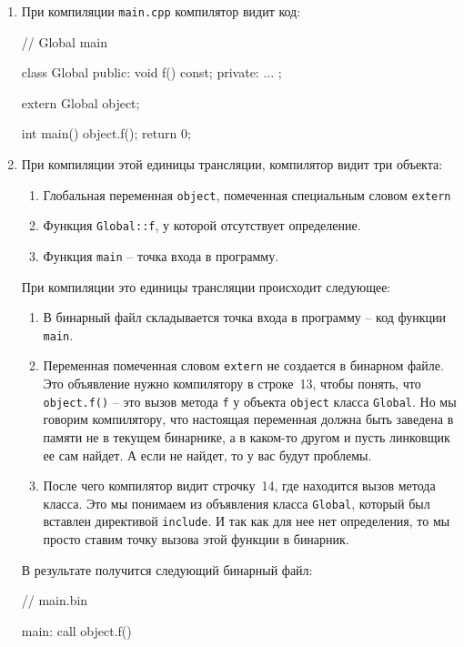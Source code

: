 {\begin{enumerate}
\item При компиляции \verb"main.cpp" компилятор видит код:
\begin{cppcode}
// Global main

class Global {
public:
  void f() const;
private:
  ...
};

extern Global object;

int main() {
  object.f();
  return 0;
}
\end{cppcode}

\item При компиляции этой единицы трансляции, компилятор видит три объекта:
\begin{enumerate}
\item Глобальная переменная \verb"object", помеченная специальным словом \verb"extern"

\item Функция \verb"Global::f", у которой отсутствует определение.

\item Функция \verb"main" -- точка входа в программу.
\end{enumerate}
При компиляции это единицы трансляции происходит следующее:
\begin{enumerate}
\item В бинарный файл складывается точка входа в программу -- код функции \verb"main".

\item Переменная помеченная словом \verb"extern" не создается в бинарном файле.
Это объявление нужно компилятору в строке~13, чтобы понять, что \verb"object.f()" -- это вызов метода \verb"f" у объекта \verb"object" класса \verb"Global".
Но мы говорим компилятору, что настоящая переменная должна быть заведена в памяти не в текущем бинарнике, а в каком-то другом и пусть линковщик ее сам найдет.
А если не найдет, то у вас будут проблемы.

\item После чего компилятор видит строчку~14, где находится вызов метода класса.
Это мы понимаем из объявления класса \verb"Global", который был вставлен директивой \verb"include".
И так как для нее нет определения, то мы просто ставим точку вызова этой функции в бинарник.
\end{enumerate}
В результате получится следующий бинарный файл:
\begin{cppcode}
// main.bin

main:
  call object.f()
\end{cppcode}


\end{enumerate}}
